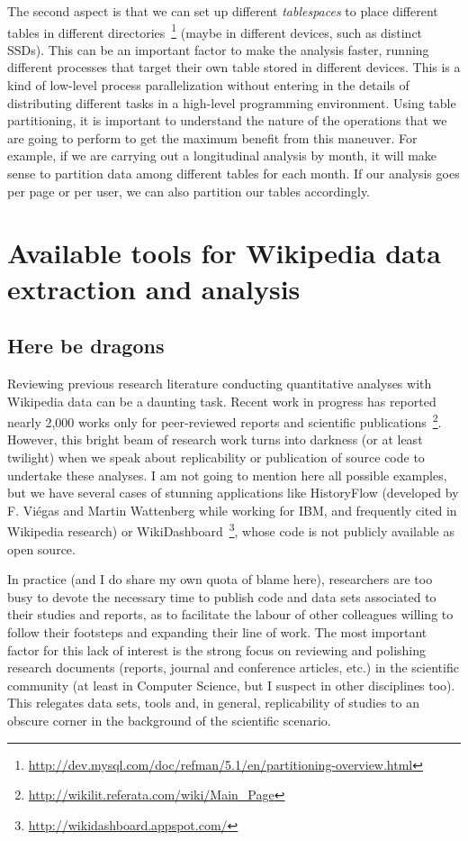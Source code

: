 The second aspect is that 
we can set up different \textit{tablespaces} to place different tables in different
directories~\footnote{\url{http://dev.mysql.com/doc/refman/5.1/en/partitioning-overview.html}}
(maybe in different devices, such as distinct SSDs). This can be an important
factor to make the analysis faster, running different processes that target their
own table stored in different devices. This is a kind of low-level process parallelization
without entering in the details of distributing different tasks in a high-level
programming environment. Using table partitioning, it is important to understand
the nature of the operations that we are going to perform to get the maximum
benefit from this maneuver. For example, if we are carrying out a longitudinal
analysis by month, it will make sense to partition data among different tables
for each month. If our analysis goes per page or per user, we can also partition
our tables accordingly.


\chapter{Available tools for Wikipedia data extraction and analysis}

\section{Here be dragons}
Reviewing previous research literature conducting quantitative analyses with
Wikipedia data can be a daunting task. Recent work in progress has reported
nearly 2,000 works only for peer-reviewed reports and scientific 
publications~\footnote{\url{http://wikilit.referata.com/wiki/Main_Page}}. However,
this bright beam of research work turns into darkness (or at least twilight) when
we speak about replicability or publication of source code to undertake these analyses. 
I am not going to mention here all possible examples, but we have several cases of stunning
applications like HistoryFlow (developed by F. Viégas and Martin Wattenberg while
working for IBM, and frequently cited in Wikipedia research) or 
WikiDashboard~\footnote{\url{http://wikidashboard.appspot.com/}}, whose
code is not publicly available as open source.

In practice (and I do share my own quota of blame here), researchers are too busy
to devote the necessary time to publish code and data sets associated to their
studies and reports, as to facilitate the labour of other colleagues willing
to follow their footsteps and expanding their line of work. The most important factor
for this lack of interest is the strong focus on reviewing and polishing research
documents (reports, journal and conference articles, etc.) in the scientific community
(at least in Computer Science, but I suspect in other disciplines too). This 
relegates data sets, tools and, in general, replicability of studies to an obscure 
corner in the background of the scientific scenario.

